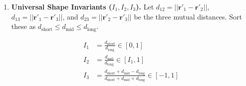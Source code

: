 \begin{enumerate}
    \item \textbf{Universal Shape Invariants ($I_1, I_2, I_3$).}
    Let $d_{12} = ||\mathbf{r}'_1 - \mathbf{r}'_2||$, $d_{13} = ||\mathbf{r}'_1 - \mathbf{r}'_3||$, and $d_{23} = ||\mathbf{r}'_2 - \mathbf{r}'_3||$ be the three mutual distances. Sort these as $d_{\text{short}} \leq d_{\text{mid}} \leq d_{\text{long}}$.

    \begin{align}
    I_1 &= \frac{d_{\text{short}}}{d_{\text{long}}} \in [0, 1] \\
    I_2 &= \frac{d_{\text{mid}}}{d_{\text{long}}} \in [I_1, 1] \\
    I_3 &= \frac{d_{\text{short}} + d_{\text{mid}} - d_{\text{long}}}{d_{\text{short}} + d_{\text{mid}} + d_{\text{long}}} \in [-1, 1]
    \end{align}

\end{enumerate}
